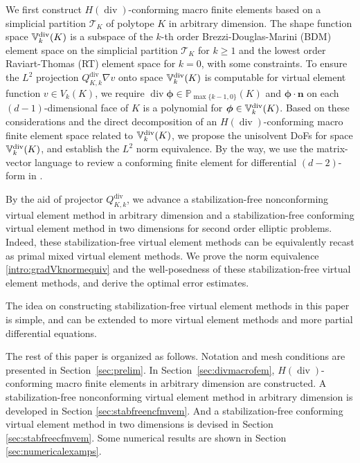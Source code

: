\documentclass[10pt]{amsart}
\renewcommand{\div}{\operatorname{div}}
\numberwithin{equation}{section}
\begin{document}
We first construct $H(\div)$-conforming macro finite elements based on a
simplicial partition $\mathcal T_K$ of polytope $K$ in arbitrary dimension. The
shape function space $\mathbb{V}_{k}^{\rm div}(K)$ is a subspace of the $k$-th
order Brezzi-Douglas-Marini (BDM) element space on the simplicial partition
$\mathcal T_K$ for $k\geq1$ and the lowest order Raviart-Thomas (RT) element
space for $k=0$, with some constraints. To ensure the $L^2$ projection
$Q_{K,k}^{\div}\nabla v$ onto space $\mathbb{V}_{k}^{\rm div}(K)$ is computable
for virtual element function $v\in V_k(K)$, we require
$\div\boldsymbol{\phi}\in\mathbb P_{\max\{k-1,0\}}(K)$ and
$\boldsymbol{\phi}\cdot\boldsymbol{n}$ on each $(d-1)$-dimensional face of $K$
is a polynomial for $\boldsymbol{\phi}\in\mathbb{V}_{k}^{\rm div}(K)$.  Based on
these considerations and the direct decomposition of an $H(\div)$-conforming
macro finite element space related to $\mathbb{V}_{k}^{\rm div}(K)$, we propose
the unisolvent DoFs for space $\mathbb{V}_{k}^{\rm div}(K)$, and establish the
$L^2$ norm equivalence.  By the way, we use the matrix-vector language to review
a conforming finite element for differential $(d-2)$-form in
\cite{ArnoldFalkWinther2006,Arnold2018}. 









By the aid of projector $Q_{K,k}^{\div}$, we advance a stabilization-free nonconforming virtual element method in arbitrary dimension and a stabilization-free conforming virtual element method in two dimensions  for second order elliptic problems.
Indeed, these stabilization-free virtual element methods can be equivalently recast as
primal mixed virtual element methods.
We prove the norm equivalence \eqref{intro:gradVknormequiv} and the well-posedness of these stabilization-free virtual element methods, and derive the optimal error estimates.

The idea on constructing stabilization-free virtual element methods in this paper is simple,
and can be extended to more virtual element methods and more partial differential equations.


The rest of this paper is organized as follows. Notation and mesh conditions are presented in Section~\ref{sec:prelim}. 
In Section~\ref{sec:divmacrofem}, $H(\div)$-conforming macro finite elements in arbitrary dimension are constructed. A stabilization-free nonconforming virtual element method in arbitrary dimension is developed in Section \ref{sec:stabfreencfmvem}. And a stabilization-free conforming virtual element method in two dimensions is devised in Section \ref{sec:stabfreecfmvem}.
Some numerical results are shown in Section \ref{sec:numericalexamps}.
\end{document}
